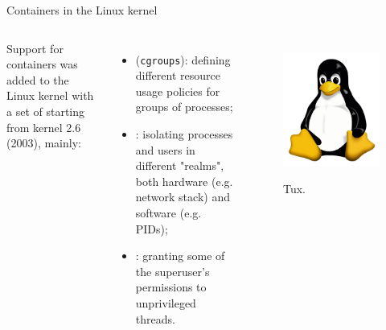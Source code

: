 \begin{frame}{Containers in the Linux kernel}
	\begin{columns}
		Support for containers was added to the Linux kernel with a set of  starting from kernel 2.6 (2003), mainly:
		\begin{itemize}
			\item {} (\texttt{cgroups}): defining different resource usage policies for groups of processes;
			\item {}: isolating processes and users in different "realms", both hardware (e.g. network stack) and software (e.g. PIDs);
			\item {}: granting some of the superuser's permissions to unprivileged threads.
		\end{itemize}

		\begin{figure}
			\centering
			\includegraphics[scale=.2]{tux.png}
			\label{fig:tux}
			\caption{Tux.}
		\end{figure}
	\end{columns}
\end{frame}
